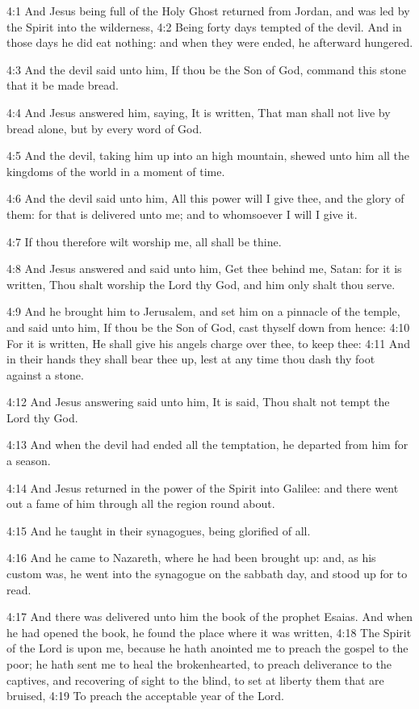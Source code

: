 4:1 And Jesus being full of the Holy Ghost returned from Jordan, and was led by the Spirit into the wilderness, 4:2 Being forty days tempted of the devil. And in those days he did eat nothing: and when they were ended, he afterward hungered.

4:3 And the devil said unto him, If thou be the Son of God, command this stone that it be made bread.

4:4 And Jesus answered him, saying, It is written, That man shall not live by bread alone, but by every word of God.

4:5 And the devil, taking him up into an high mountain, shewed unto him all the kingdoms of the world in a moment of time.

4:6 And the devil said unto him, All this power will I give thee, and the glory of them: for that is delivered unto me; and to whomsoever I will I give it.

4:7 If thou therefore wilt worship me, all shall be thine.

4:8 And Jesus answered and said unto him, Get thee behind me, Satan: for it is written, Thou shalt worship the Lord thy God, and him only shalt thou serve.

4:9 And he brought him to Jerusalem, and set him on a pinnacle of the temple, and said unto him, If thou be the Son of God, cast thyself down from hence: 4:10 For it is written, He shall give his angels charge over thee, to keep thee: 4:11 And in their hands they shall bear thee up, lest at any time thou dash thy foot against a stone.

4:12 And Jesus answering said unto him, It is said, Thou shalt not tempt the Lord thy God.

4:13 And when the devil had ended all the temptation, he departed from him for a season.

4:14 And Jesus returned in the power of the Spirit into Galilee: and there went out a fame of him through all the region round about.

4:15 And he taught in their synagogues, being glorified of all.

4:16 And he came to Nazareth, where he had been brought up: and, as his custom was, he went into the synagogue on the sabbath day, and stood up for to read.

4:17 And there was delivered unto him the book of the prophet Esaias.  And when he had opened the book, he found the place where it was written, 4:18 The Spirit of the Lord is upon me, because he hath anointed me to preach the gospel to the poor; he hath sent me to heal the brokenhearted, to preach deliverance to the captives, and recovering of sight to the blind, to set at liberty them that are bruised, 4:19 To preach the acceptable year of the Lord.

